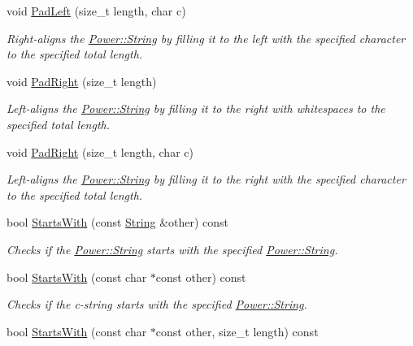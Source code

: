 \begin{DoxyCompactItemize}
void \hyperlink{class_power_1_1_string_ae1a401f8fc597068ac70fc1f18dee45c}{Pad\+Left} (size\+\_\+t length, char c)
\begin{DoxyCompactList}\small\item\em Right-\/aligns the \hyperlink{class_power_1_1_string}{Power\+::\+String} by filling it to the left with the specified character to the specified total length. \end{DoxyCompactList}\item 
void \hyperlink{class_power_1_1_string_a48bd3019edb44ed96a6b69f3adf0d82d}{Pad\+Right} (size\+\_\+t length)
\begin{DoxyCompactList}\small\item\em Left-\/aligns the \hyperlink{class_power_1_1_string}{Power\+::\+String} by filling it to the right with whitespaces to the specified total length. \end{DoxyCompactList}\item 
void \hyperlink{class_power_1_1_string_ae8f53778737d45ccf92e466fb5d179de}{Pad\+Right} (size\+\_\+t length, char c)
\begin{DoxyCompactList}\small\item\em Left-\/aligns the \hyperlink{class_power_1_1_string}{Power\+::\+String} by filling it to the right with the specified character to the specified total length. \end{DoxyCompactList}\item 
bool \hyperlink{class_power_1_1_string_ab4836da082c63ddf9f781eb80a10e5d1}{Starts\+With} (const \hyperlink{class_power_1_1_string}{String} \&other) const
\begin{DoxyCompactList}\small\item\em Checks if the \hyperlink{class_power_1_1_string}{Power\+::\+String} starts with the specified \hyperlink{class_power_1_1_string}{Power\+::\+String}. \end{DoxyCompactList}\item 
bool \hyperlink{class_power_1_1_string_a97d52a90799b590cfed6f3ce9d2204fc}{Starts\+With} (const char $\ast$const other) const
\begin{DoxyCompactList}\small\item\em Checks if the c-\/string starts with the specified \hyperlink{class_power_1_1_string}{Power\+::\+String}. \end{DoxyCompactList}\item 
bool \hyperlink{class_power_1_1_string_a5f0999383b26616b84abe75a4ea8a185}{Starts\+With} (const char $\ast$const other, size\+\_\+t length) const

\end{DoxyCompactItemize}

